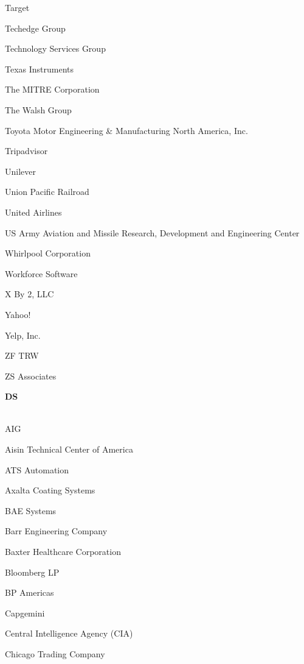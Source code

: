 \documentclass[twoside]{article}
\begin{document}
\begin{center}
\begin{multicols}{5}
\begin{FlushLeft}
\begin{compactitem}
\item Target
\item Techedge Group
\item Technology Services Group
\item Texas Instruments
\item The MITRE Corporation
\item The Walsh Group
\item Toyota Motor Engineering \& Manufacturing North America, Inc.
\item Tripadvisor
\item Unilever
\item Union Pacific Railroad
\item United Airlines
\item US Army Aviation and Missile Research, Development and Engineering Center
\item Whirlpool Corporation
\item Workforce Software
\item X By 2, LLC
\item Yahoo!
\item Yelp, Inc.
\item ZF TRW
\item ZS Associates
\end{compactitem}
        \end{FlushLeft}
        \vspace{1em}
        {\fontsize{14}{16}\selectfont \bf DS}\\
        \vspace{-1em}
        ~\hrulefill~
        \vspace{-.9em}
        \begin{FlushLeft}
        \begin{compactitem}
        \item AIG
\item Aisin Technical Center of America
\item ATS Automation
\item Axalta Coating Systems
\item BAE Systems
\item Barr Engineering Company
\item Baxter Healthcare Corporation
\item Bloomberg LP
\item BP Americas
\item Capgemini
\item Central Intelligence Agency (CIA)
\item Chicago Trading Company

\end{compactitem}
\end{FlushLeft}
\end{multicols}
\end{center}
\end{document}
